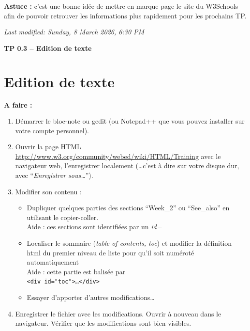\documentclass[11pt]{article}
\begin{document}
\textbf{Astuce :} c'est une bonne idée de mettre en marque page le site du W3Schools afin de pouvoir retrouver les informations plus rapidement pour les prochains TP.

\vspace{1em}
\noindent\textit{Last modified: Sunday, 8 March 2026, 6:30 PM}

\newpage
{}

{\Large\bfseries TP 0.3 -- Edition de texte}

\bigskip

\section{Edition de texte}

\begin{afaire}
\textbf{A faire :}

\begin{enumerate}
    \item Démarrer le bloc-note ou gedit (ou Notepad++ que vous pouvez installer sur votre compte personnel).
    \item Ouvrir la page HTML \url{http://www.w3.org/community/webed/wiki/HTML/Training} avec le navigateur web, l'enregistrer localement (\ldots c'est à dire sur votre disque dur, avec ``\textit{Enregistrer sous\ldots}'').
    \item Modifier son contenu :
    \begin{itemize}
        \item Dupliquer quelques parties des sections ``Week\_2'' ou ``See\_also'' en utilisant le copier-coller.\\
        Aide : ces sections sont identifiées par un \textit{id=}
        \item Localiser le sommaire (\textit{table of contents, toc}) et modifier la définition html du premier niveau de liste pour qu'il soit numéroté automatiquement\\
        Aide : cette partie est balisée par\\
        \texttt{<div id="toc">\ldots</div>}
        \item Essayer d'apporter d'autres modifications\ldots
    \end{itemize}
    \item Enregistrer le fichier avec les modifications. Ouvrir à nouveau dans le navigateur. Vérifier que les modifications sont bien visibles.
\end{enumerate}
\end{afaire}
\end{document}
